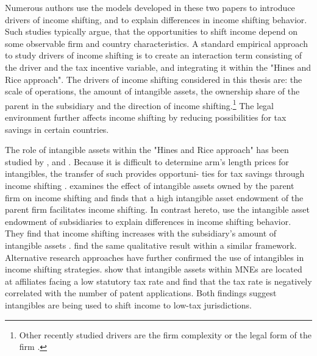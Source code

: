 \documentclass[10pt,twocolumn,oneside,cmyk]{article}
\begin{document}
Numerous authors use the models developed in these two papers to introduce drivers of income shifting, and to explain differences in income shifting behavior. Such studies typically argue, that the opportunities to shift income depend on some observable firm and country characteristics. A standard empirical approach to study drivers of income shifting is to create an interaction term consisting of the driver and the tax incentive variable, and integrating it within the "Hines and Rice approach". The drivers of income shifting considered in this thesis are: the scale of operations, the amount of intangible assets, the ownership share of the parent in the subsidiary and the direction of income shifting.\footnote{Other recently studied drivers are the firm complexity \parencite{beer_profit_2015} or the legal form of the firm \parencite{beuselinck_cross-jurisdictional_2015}.} The legal environment further affects income shifting by reducing possibilities for tax savings in certain countries.

The role of intangible assets within the "Hines and Rice approach" has been studied by \textcite{grubert_intangible_2003}, \textcite{beer_profit_2015} and \textcite{dischinger_corporate_2011}. Because it is difficult to determine arm's length prices for intangibles, the transfer of such provides opportuni- ties for tax savings through income shifting \parencites[2235]{bartelsman_why_2003}[428]{beer_profit_2015}. \textcite[229]{grubert_intangible_2003} examines the effect of intangible assets owned by the parent firm on income shifting and finds that a high intangible asset endowment of the parent firm facilitates income shifting. In contrast hereto, \textcite{beer_profit_2015} use the intangible asset endowment of subsidiaries to explain differences in income shifting behavior. They find that income shifting increases with the subsidiary's amount of intangible assets \parencite[434]{beer_profit_2015}. \textcite[699-700]{dischinger_corporate_2011} find the same qualitative result within a similar framework. Alternative research approaches have further confirmed the use of intangibles in income shifting strategies. \textcite[13]{dischinger_corporate_2008} show that intangible assets within MNEs are located at affiliates facing a low statutory tax rate and \textcite[182]{karkinsky_corporate_2012} find that the tax rate is negatively correlated with the number of patent applications. Both findings suggest intangibles are being used to shift income to low-tax jurisdictions.
\end{document}
